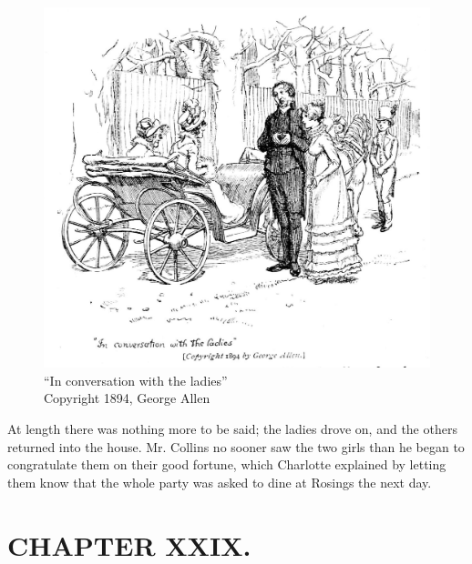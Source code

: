 \begin{figure}[htbp]
    \centering
    \includegraphics[width=\textwidth]{illustrations/i_227.jpg}
    \caption{“In conversation with the ladies”\\ Copyright 1894, George Allen}
    \label{fig:image}
\end{figure}

At length there was nothing more to be said; the ladies drove on, and the others returned into the house. Mr. Collins no sooner saw the two girls than he began to congratulate them on their good fortune, which Charlotte explained by letting them know that the whole party was asked to dine at Rosings the next day.



\chapter{CHAPTER XXIX.}

